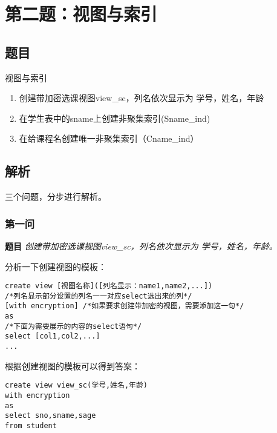 \section{第二题：视图与索引}

\subsection{题目}

\qquad 视图与索引

\begin{enumerate}
  \item 创建带加密选课视图view\_sc，列名依次显示为 学号，姓名，年龄
  \item 在学生表中的sname上创建非聚集索引(Sname\_ind)
  \item 在给课程名创建唯一非聚集索引（Cname\_ind）
\end{enumerate}

\subsection{解析}
\qquad 三个问题，分步进行解析。

\subsubsection{第一问}

\textbf{题目} \emph{创建带加密选课视图view\_sc，列名依次显示为 学号，姓名，年龄。}

\vspace{6pt}

\qquad 分析一下创建视图的模板：

\begin{mdframed}[backgroundcolor=gray!10]
\begin{verbatim}
create view [视图名称]([列名显示：name1,name2,...])
/*列名显示部分设置的列名一一对应select选出来的列*/
[with encryption] /*如果要求创建带加密的视图，需要添加这一句*/
as
/*下面为需要展示的内容的select语句*/
select [col1,col2,...]
...
\end{verbatim}
\end{mdframed}

\qquad 根据创建视图的模板可以得到答案：

\begin{mdframed}[backgroundcolor=blue!5]
\begin{verbatim}
create view view_sc(学号,姓名,年龄)
with encryption
as
select sno,sname,sage
from student
\end{verbatim}
\end{mdframed}


